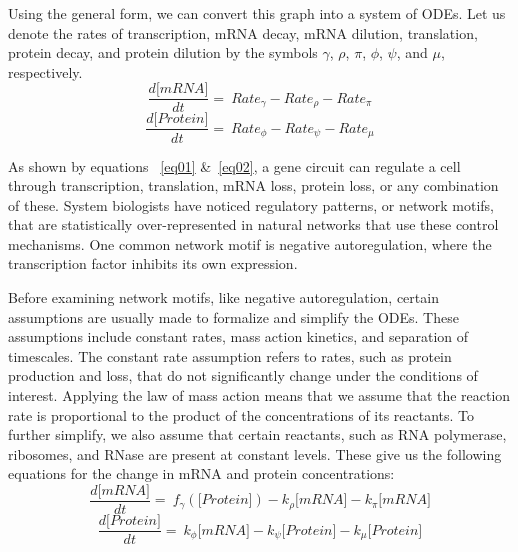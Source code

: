 \documentclass[conference]{IEEEtran}
\begin{document}
Using the general form, we can convert this graph into a system of ODEs. Let us denote the rates of transcription, mRNA decay, mRNA dilution, translation, protein decay, and protein dilution by the symbols $\gamma$, $\rho$, $\pi$, $\phi$, $\psi$, and $\mu$, respectively.
\begin{equation}
\frac{d\lbrack mRNA\rbrack}{dt} = \ Rate_{\gamma} - Rate_{\rho} - Rate_{\pi} \label{eq01}
\end{equation}
\begin{equation}
\frac{d\lbrack Protein\rbrack}{dt} = \ Rate_{\phi} - Rate_{\psi} - Rate_{\mu}\label{eq02}
\end{equation}

As shown by equations ~\ref{eq01} \&~\ref{eq02}, a gene circuit can regulate a cell through transcription, translation, mRNA loss, protein loss, or any combination of these. System biologists have noticed regulatory patterns, or network motifs, that are statistically over-represented in natural networks that use these control mechanisms. One common network motif is negative autoregulation, where the transcription factor inhibits its own expression.

Before examining network motifs, like negative autoregulation, certain assumptions are usually made to formalize and simplify the ODEs. These assumptions include constant rates, mass action kinetics, and separation of timescales. The constant rate assumption refers to rates, such as protein production and loss, that do not significantly change under the conditions of interest. Applying the law of mass action means that we assume that the reaction rate is proportional to the product of the concentrations of its reactants. To further simplify, we also assume that certain reactants, such as RNA polymerase, ribosomes, and RNase are present at constant levels. These give us the following equations for the change in mRNA and protein concentrations:
\begin{equation}
\frac{d\lbrack mRNA\rbrack}{dt} = \ f_{\gamma}\left( \lbrack Protein\rbrack \right) - k_{\rho}\lbrack mRNA\rbrack - k_{\pi}\lbrack mRNA\rbrack\label{eq3}
\end{equation}
\begin{equation}
\frac{d\lbrack Protein\rbrack}{dt} = \ k_{\phi}\lbrack mRNA\rbrack - k_{\psi}\lbrack Protein\rbrack - k_{\mu}\lbrack Protein\rbrack\label{eq4}
\end{equation}
\end{document}
